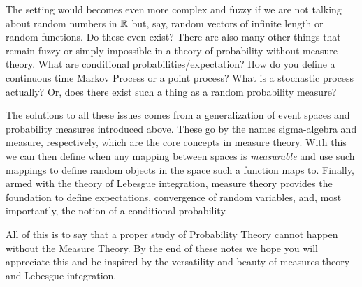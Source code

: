 The setting would becomes even more complex and fuzzy if we are not talking about random numbers in $\mathbb R$ but, say, random vectors of infinite length or random functions. Do these even exist? There are also many other things that remain fuzzy or simply impossible in a theory of probability without measure theory. What are conditional probabilities/expectation? How do you define a continuous time Markov Process or a point process? What is a stochastic process actually? Or, does there exist such a thing as a random probability measure?

The solutions to all these issues comes from a generalization of event spaces and probability measures introduced above. These go by the names sigma-algebra and measure, respectively, which are the core concepts in measure theory. With this we can then define when any mapping between spaces is \emph{measurable} and use such mappings to define random objects in the space such a function maps to. Finally, armed with the theory of Lebesgue integration, measure theory provides the foundation to define expectations, convergence of random variables, and, most importantly, the notion of a conditional probability. 

All of this is to say that a proper study of Probability Theory cannot happen without the Measure Theory. By the end of these notes we hope you will appreciate this and be inspired by the versatility and beauty of measures theory and Lebesgue integration.



